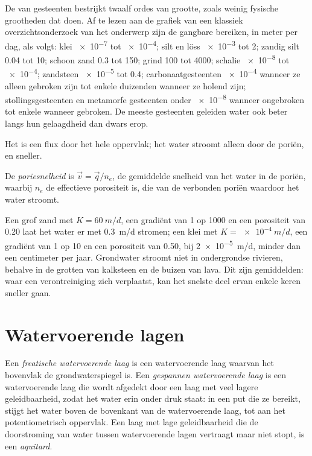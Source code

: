 De  van gesteenten bestrijkt twaalf ordes van grootte,
zoals weinig fysische grootheden dat doen. Af te lezen aan de grafiek van een klassiek
overzichtsonderzoek van het onderwerp zijn de gangbare bereiken, in meter per dag, als volgt: klei
\num{e-7} tot \num{e-4}; silt en löss \num{e-3} tot 2; zandig silt 0.04 tot
10; schoon zand 0.3 tot 150; grind 100 tot 4000; schalie \num{e-8} tot
\num{e-4}; zandsteen \num{e-5} tot 0.4; carbonaatgesteenten \num{e-4} wanneer ze
alleen gebroken zijn tot enkele duizenden wanneer ze holend zijn; stollingsgesteenten en
metamorfe gesteenten onder \num{e-8} wanneer ongebroken tot enkele wanneer
gebroken. De meeste gesteenten geleiden water ook beter langs hun gelaagdheid dan
dwars erop.

Het  is een flux door het hele oppervlak; het water stroomt
alleen door de poriën, en sneller.

\begin{definition}[Poriesnelheid]\label{def:b3:hydrogeology:seepage}
De \emph{poriesnelheid} is $\vec v = \vec
q/n_e$, de gemiddelde snelheid van het water in de poriën, waarbij $n_e$ de
effectieve porositeit is, die van de verbonden poriën waardoor het water
stroomt.
\end{definition}

Een grof zand met $K = \qty{60}{m/d}$, een gradiënt van 1 op 1000 en een
porositeit van 0.20 laat het water er met \qty{0.3}{m/d} stromen; een klei met $K =
\qty{e-4}{m/d}$, een gradiënt van 1 op 10 en een porositeit van 0.50, bij
\qty{2e-5}{m/d}, minder dan een centimeter per jaar. Grondwater stroomt niet
in ondergrondse rivieren, behalve in de grotten van kalksteen en de buizen
van lava. Dit zijn gemiddelden: waar een verontreiniging zich verplaatst, kan het
snelste deel ervan enkele keren sneller gaan.

\section{Watervoerende lagen}\label{sec:b3:hydrogeology:aquifers}

\begin{definition}\label{def:b3:hydrogeology:aquifer-types}
Een \emph{freatische watervoerende laag} is een watervoerende laag waarvan het
bovenvlak de grondwaterspiegel is. Een \emph{gespannen
watervoerende laag} is een watervoerende laag die wordt afgedekt door een laag met veel
lagere geleidbaarheid, zodat het water erin onder druk staat: in een put die
ze bereikt, stijgt het water boven de bovenkant van de watervoerende laag,
tot aan het potentiometrisch oppervlak. Een laag met lage geleidbaarheid die de
doorstroming van water tussen watervoerende lagen vertraagt maar niet stopt, is een
\emph{aquitard}.
\end{definition}

